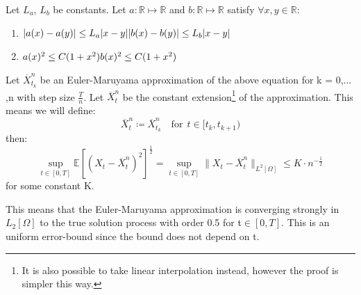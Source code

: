 \begin{theorem}
Let \(L_a\), \(L_b\) be constants. 
Let \(a:\mathbb{R}\mapsto\mathbb{R}\) and \(b:\mathbb{R}\mapsto\mathbb{R}\) satisfy \(\forall x,y\in\mathbb{R}\):
\begin{enumerate}[noitemsep,topsep=0mm,labelindent=6mm,leftmargin=*,widest=3.,align=right]
\item \(|a(x) - a(y)| \leq L_a|x-y| \\
	    |b(x) - b(y)| \leq L_b|x-y|\)	
\item \(a(x)^2 \leq C(1+x^2) \\
	    b(x)^2 \leq C(1+x^2) \)
\end{enumerate}
Let \(\overline{X}^n_{t_{k}}\) be an Euler-Maruyama approximation of the above equation for k = 0,\(\dots\),n with step size \(\frac{T}{n}\).
Let \(\overline{X}^n_{t}\) be the constant extension\footnote{It is also possible to take linear interpolation instead, however the proof is simpler this way.} of the approximation. This means we will define:
\[\overline{X}^n_{t}\coloneqq\overline{X}^n_{t_{k}}\quad\text{for}\:\:t\in[t_k,t_{k+1})\]
then:
\[\sup_{t\in[0,T]}\mathbb{E}[(X_t-\overline{X}^n_{t})^2]^{\frac{1}{2}} = \sup_{t\in[0,T]}\|X_t-\overline{X}^n_{t}\|_{L^2[\Omega]}\leq K\cdot n^{-\frac{1}{2}}\]
for some constant K.
\end{theorem}
This means that the Euler-Maruyama approximation is converging strongly in \(L_2[\Omega]\) to the true solution process with order 0.5 for t\(\in\![0,T]\). This is an uniform error-bound since the bound does not depend on t.
